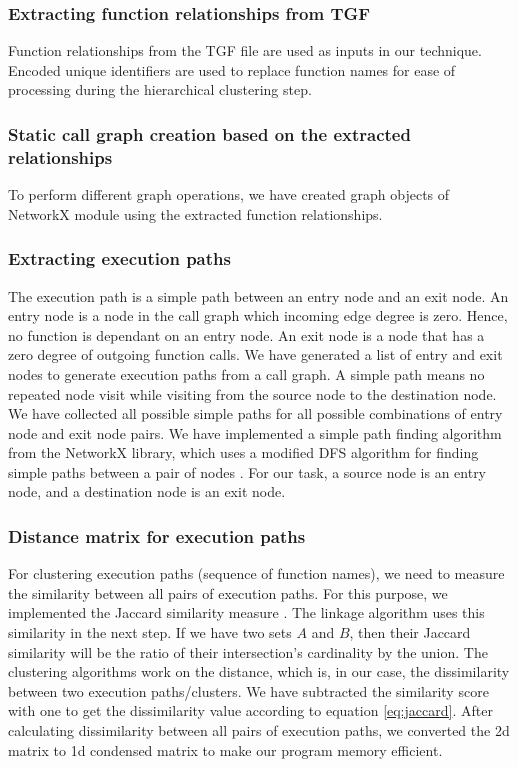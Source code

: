 \subsubsection{Extracting function relationships from TGF}

Function relationships from the TGF file are used as inputs in our technique. Encoded unique identifiers are used to replace function names for ease of processing during the hierarchical clustering step.

\subsubsection{Static call graph creation based on the extracted relationships}
To perform different graph operations, we have created graph objects of NetworkX \cite{networkx} module using the extracted function relationships. 
\subsubsection{Extracting execution paths}

The execution path is a simple path between an entry node and an exit node. An entry node is a node in the call graph which incoming edge degree is zero. Hence, no function is dependant on an entry node. An exit node is a node that has a zero degree of outgoing function calls. We have generated a list of entry and exit nodes to generate execution paths from a call graph. A simple path means no repeated node visit while visiting from the source node to the destination node. We have collected all possible simple paths for all possible combinations of entry node and exit node pairs. We have implemented a simple path finding algorithm from the NetworkX library, which uses a modified DFS algorithm for finding simple paths between a pair of nodes \cite{networkx}. For our task, a source node is an entry node, and a destination node is an exit node.    

\subsubsection{Distance matrix for execution paths}

For clustering execution paths (sequence of function names), we need to measure the similarity between all pairs of execution paths. For this purpose, we implemented the Jaccard similarity measure \cite{niwattanakul2013using}. The linkage algorithm uses this similarity in the next step. If we have two sets $ A $ and $ B $, then their Jaccard similarity will be the ratio of their intersection's cardinality by the union. The clustering algorithms work on the distance, which is, in our case, the dissimilarity between two execution paths/clusters. We have subtracted the similarity score with one to get the dissimilarity value according to equation \ref{eq:jaccard}. After calculating dissimilarity between all pairs of execution paths, we converted the 2d matrix to 1d condensed matrix to make our program memory efficient.

